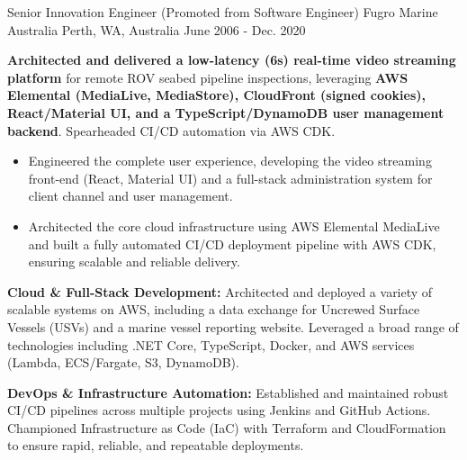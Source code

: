 

\begin{cventries}

  \cventry
    {Senior Innovation Engineer (Promoted from Software Engineer)} %
    {Fugro Marine Australia} %
    {Perth, WA, Australia} %
    {June 2006 - Dec. 2020} %
    {
      \begin{cvitems} %
        \item {\textbf{Architected and delivered a low-latency (6s) real-time video streaming platform} for remote ROV seabed pipeline inspections, leveraging \textbf{AWS Elemental (MediaLive, MediaStore), CloudFront (signed cookies), React/Material UI, and a TypeScript/DynamoDB user management backend}. Spearheaded CI/CD automation via AWS CDK.}
          \begin{itemize}
            \item {Engineered the complete user experience, developing the video streaming front-end (React, Material UI) and a full-stack administration system for client channel and user management.}
            \item {Architected the core cloud infrastructure using AWS Elemental MediaLive and built a fully automated CI/CD deployment pipeline with AWS CDK, ensuring scalable and reliable delivery.}
          \end{itemize}
        \item {\textbf{Cloud \& Full-Stack Development:} Architected and deployed a variety of scalable systems on AWS, including a data exchange for Uncrewed Surface Vessels (USVs) and a marine vessel reporting website. Leveraged a broad range of technologies including .NET Core, TypeScript, Docker, and AWS services (Lambda, ECS/Fargate, S3, DynamoDB).}
        \item {\textbf{DevOps \& Infrastructure Automation:} Established and maintained robust CI/CD pipelines across multiple projects using Jenkins and GitHub Actions. Championed Infrastructure as Code (IaC) with Terraform and CloudFormation to ensure rapid, reliable, and repeatable deployments.}

\end{cvitems}}
\end{cventries}
